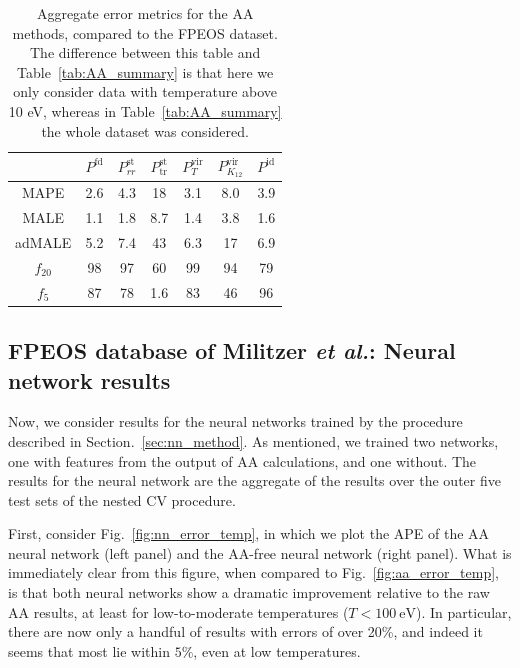 \documentclass[%
 preprint,
 superscriptaddress,
 amsmath,amssymb,
longbibliography,
]{revtex4-2}
\newcommand{\Pfd}{P^\textrm{fd}}
\newcommand{\Pstrr}{P^\textrm{st}_{rr}}
\newcommand{\Psttr}{P^\textrm{st}_\textrm{tr}}
\newcommand{\Pvirt}{P^\textrm{vir}_T}
\newcommand{\Pvirk}{P^\textrm{vir}_{K_{12}}}
\newcommand{\Pid}{P^\textrm{id}}
\begin{document}
\begin{table}[]
    \centering
    \begin{tabular}{ccccccc}
        \toprule
         & $\Pfd$ & $\Pstrr$ & $\Psttr$ & $\Pvirt$ & $\Pvirk$ & $\Pid$ \\ \midrule
        MAPE & 2.6 & 4.3 & 18 & 3.1 & 8.0 & 3.9 \\
        MALE & 1.1 & 1.8 & 8.7 & 1.4 & 3.8 & 1.6 \\
        adMALE & 5.2 & 7.4 & 43 & 6.3 & 17 & 6.9 \\
        $f_{20}$ & 98 & 97 & 60 & 99 & 94 & 79 \\
        $f_{5}$ & 87 & 78 & 1.6 & 83 & 46 & 96 \\
        \bottomrule
    \end{tabular}
    \caption{Aggregate error metrics for the AA methods, compared to the FPEOS dataset\cite{Militzer_EOS_database}. The difference between this table and Table~\ref{tab:AA_summary} is that here we only consider data with temperature above 10 eV, whereas in Table~\ref{tab:AA_summary} the whole dataset was considered.}
    \label{tab:AA_summary_high_T}
\end{table}

\subsection{FPEOS database of Militzer \emph{et al.}: Neural network results}\label{sec:results_nn_fpeos}

Now, we consider results for the neural networks trained by the procedure described in Section.~\ref{sec:nn_method}. As mentioned, we trained two networks, one with features from the output of AA calculations, and one without. The results for the neural network are the aggregate of the results over the outer five test sets of the nested CV procedure.

First, consider Fig.~\ref{fig:nn_error_temp}, in which we plot the APE of the AA neural network (left panel) and the AA-free neural network (right panel). What is immediately clear from this figure, when compared to Fig.~\ref{fig:aa_error_temp}, is that both neural networks show a dramatic improvement relative to the raw AA results, at least for low-to-moderate temperatures ($T<100\ \textrm{eV}$). In particular, there are now only a handful of results with errors of over 20\%, and indeed it seems that most lie within $5\%$, even at low temperatures.
\end{document}
